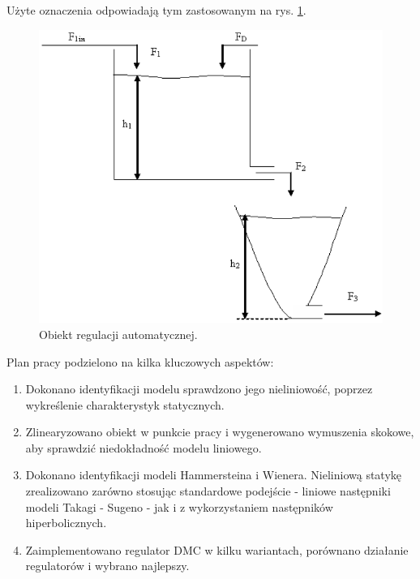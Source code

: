 \noindent Użyte oznaczenia odpowiadają tym zastosowanym na rys. \ref{schemat}. 

\newpage

\begin{figure}[h!]
\centering
\includegraphics[width=\textwidth]{pictures/schemat}
\caption{Obiekt regulacji automatycznej.}
\label{schemat}
\end{figure}

Plan pracy podzielono na kilka kluczowych aspektów:

\begin{enumerate}
\item Dokonano identyfikacji modelu sprawdzono jego nieliniowość, poprzez wykreślenie charakterystyk statycznych.
\item Zlinearyzowano obiekt w punkcie pracy i wygenerowano wymuszenia skokowe, aby sprawdzić niedokładność modelu liniowego.
\item Dokonano identyfikacji modeli Hammersteina i Wienera. Nieliniową statykę zrealizowano zarówno stosując standardowe podejście - liniowe następniki modeli Takagi - Sugeno - jak i z wykorzystaniem następników hiperbolicznych. 
\item Zaimplementowano regulator DMC w kilku wariantach, porównano działanie regulatorów i wybrano najlepszy.
\end{enumerate}